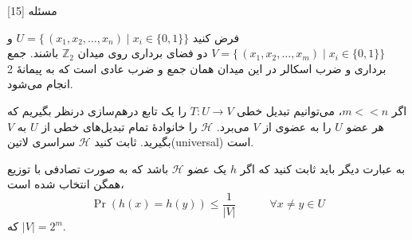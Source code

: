 ‌مسئله [15]


% 
%
%
% 

فرض کنید $U=\{ \, (x_1,x_2,\dots ,x_n) \mid x_i \in \{0,1\}\}$ و $V=\{ \, (x_1,x_2,\dots ,x_m) \mid x_i \in \{0,1\}\}$ دو فضای برداری روی میدان ${\mathbb{Z}}_2$ باشند. جمع برداری و ضرب اسکالر در این میدان همان جمع و ضرب عادی است که به پیمانۀ 2 انجام می‌شود.

اگر $m<<n$، می‌توانیم تبدیل خطی $T:U\rightarrow V$ را یک تابع درهم‌سازی درنظر بگیریم که هر عضو $U$ را به عضوی از $V$ می‌برد.
$\mathcal{H}$ را خانوادۀ تمام تبدیل‌های خطی از $U$ به $V$ بگیرید.
ثابت کنید $\mathcal{H}$ سراسری ‌لاتین{(universal)} است.

به عبارت دیگر باید ثابت کنید که اگر $h$ یک عضو $\mathcal{H}$ باشد که به صورت تصادفی با توزیع همگن انتخاب شده است،
$$\Pr ( h(x) = h(y) ) \le \frac{1}{|V|} \quad  \qquad \forall x\neq y \in U$$
که $|V| = 2^{m}$.

